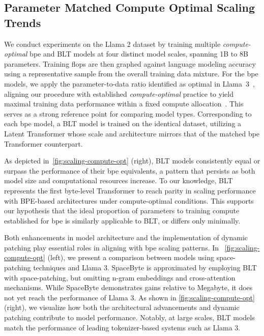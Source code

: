 \subsection{Parameter Matched Compute Optimal Scaling Trends}
\label{section:parameter-matched-scaling}
We conduct experiments on the Llama 2 dataset by training multiple \textit{compute-optimal} bpe and {\textsc BLT} models at four distinct model scales, spanning 1B to 8B parameters. Training flops are then graphed against language modeling accuracy using a representative sample from the overall training data mixture. For the bpe models, we apply the parameter-to-data ratio identified as optimal in Llama~3~\citep{dubey2024llama}, aligning our procedure with established \textit{compute-optimal} practice to yield maximal training data performance within a fixed compute allocation~\citep{hoffmann2022training}. This serves as a strong reference point for comparing model types. Corresponding to each bpe model, a {\textsc BLT} model is trained on the identical dataset, utilizing a Latent Transformer whose scale and architecture mirrors that of the matched bpe Transformer counterpart.

As depicted in~\autoref{fig:scaling-compute-opt} (right), {\textsc BLT} models consistently equal or surpass the performance of their bpe equivalents, a pattern that persists as both model size and computational resources increase. To our knowledge, {\textsc BLT} represents the first byte-level Transformer to reach parity in scaling performance with BPE-based architectures under compute-optimal conditions. This supports our hypothesis that the ideal proportion of parameters to training compute established for bpe is similarly applicable to {\textsc BLT}, or differs only minimally.

Both enhancements in model architecture and the implementation of dynamic patching play essential roles in aligning with bpe scaling patterns. In ~\autoref{fig:scaling-compute-opt} (left), we present a comparison between models using space-patching techniques and Llama 3. SpaceByte \citep{slagle2024spacebyte} is approximated by employing {\textsc BLT} with space-patching, but omitting n-gram embeddings and cross-attention mechanisms. While SpaceByte demonstrates gains relative to Megabyte, it does not yet reach the performance of Llama 3. As shown in \autoref{fig:scaling-compute-opt} (right), we visualize how both the architectural advancements and dynamic patching contribute to model performance. Notably, at large scales, {\textsc BLT} models match the performance of leading tokenizer-based systems such as Llama 3.

